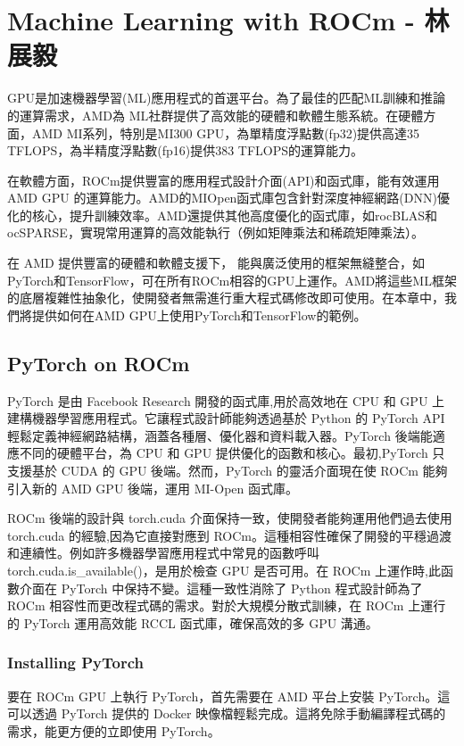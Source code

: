 \chapter{Machine Learning with ROCm - 林展毅}

GPU是加速機器學習(ML)應用程式的首選平台。為了最佳的匹配ML訓練和推論的運算需求，AMD為 ML社群提供了高效能的硬體和軟體生態系統。在硬體方面，AMD MI系列，特別是MI300 GPU，為單精度浮點數(fp32)提供高達35 TFLOPS，為半精度浮點數(fp16)提供383 TFLOPS的運算能力。

在軟體方面，ROCm提供豐富的應用程式設計介面(API)和函式庫，能有效運用 AMD GPU 的運算能力。AMD的MIOpen函式庫包含針對深度神經網路(DNN)優化的核心，提升訓練效率。AMD還提供其他高度優化的函式庫，如rocBLAS和 ocSPARSE，實現常用運算的高效能執行（例如矩陣乘法和稀疏矩陣乘法）。

在 AMD 提供豐富的硬體和軟體支援下， 能與廣泛使用的框架無縫整合，如PyTorch和TensorFlow，可在所有ROCm相容的GPU上運作。AMD將這些ML框架的底層複雜性抽象化，使開發者無需進行重大程式碼修改即可使用。在本章中，我們將提供如何在AMD GPU上使用PyTorch和TensorFlow的範例。

\section{PyTorch on ROCm}

PyTorch 是由 Facebook Research 開發的函式庫,用於高效地在 CPU 和 GPU 上建構機器學習應用程式。它讓程式設計師能夠透過基於 Python 的 PyTorch API 輕鬆定義神經網路結構，涵蓋各種層、優化器和資料載入器。PyTorch 後端能適應不同的硬體平台，為 CPU 和 GPU 提供優化的函數和核心。最初,PyTorch 只支援基於 CUDA 的 GPU 後端。然而，PyTorch 的靈活介面現在使 ROCm 能夠引入新的 AMD GPU 後端，運用 MI-Open 函式庫。

ROCm 後端的設計與 torch.cuda 介面保持一致，使開發者能夠運用他們過去使用 torch.cuda 的經驗,因為它直接對應到 ROCm。這種相容性確保了開發的平穩過渡和連續性。例如許多機器學習應用程式中常見的函數呼叫 torch.cuda.is\_available()，是用於檢查 GPU 是否可用。在 ROCm 上運作時,此函數介面在 PyTorch 中保持不變。這種一致性消除了 Python 程式設計師為了 ROCm 相容性而更改程式碼的需求。對於大規模分散式訓練，在 ROCm 上運行的 PyTorch 運用高效能 RCCL 函式庫，確保高效的多 GPU 溝通。

\subsection{Installing PyTorch}

要在 ROCm GPU 上執行 PyTorch，首先需要在 AMD 平台上安裝 PyTorch。這可以透過 PyTorch 提供的 Docker 映像檔輕鬆完成。這將免除手動編譯程式碼的需求，能更方便的立即使用 PyTorch。

